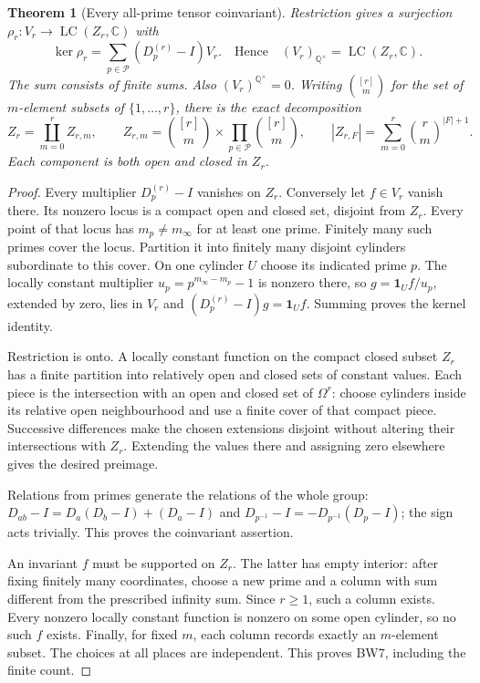 \documentclass[11pt]{article}
\newtheorem{theorem}{Theorem}
\newcommand{\C}{\mathbb C}
\newcommand{\Q}{\mathbb Q}
\newcommand{\LC}{\operatorname{LC}}
\begin{document}
\begin{theorem}[Every all-prime tensor coinvariant]
Restriction gives a surjection $\rho_r:V_r\to\LC(Z_r,\C)$ with
\[
 \ker\rho_r=\sum_{p\in\mathcal P}(D_p^{(r)}-I)V_r.
 \quad\text{Hence}\quad
 (V_r)_{\Q^\times}=\LC(Z_r,\C).
 \tag{BW6}
\]
The sum consists of finite sums. Also $(V_r)^{\Q^\times}=0$.
Writing $\binom{[r]}m$ for the set of $m$-element subsets of
$\{1,\ldots,r\}$, there is the exact decomposition
\[
 Z_r=\coprod_{m=0}^r Z_{r,m},\qquad
 Z_{r,m}=\binom{[r]}m\times\prod_{p\in\mathcal P}\binom{[r]}m,
 \qquad
 |Z_{r,F}|=\sum_{m=0}^r\binom rm^{|F|+1}.
 \tag{BW7}
\]
Each component is both open and closed in $Z_r$.
\end{theorem}
\begin{proof}
Every multiplier $D_p^{(r)}-I$ vanishes on $Z_r$. Conversely let
$f\in V_r$ vanish there. Its nonzero locus is a compact open and closed
set, disjoint from $Z_r$. Every point of that locus has
$m_p\ne m_\infty$ for at least one prime. Finitely many such primes
cover the locus. Partition it into finitely many disjoint cylinders
subordinate to this cover. On one cylinder $U$ choose its indicated
prime $p$. The locally constant multiplier
$u_p=p^{m_\infty-m_p}-1$ is nonzero there, so
$g=\mathbf1_Uf/u_p$, extended by zero, lies in $V_r$ and
$(D_p^{(r)}-I)g=\mathbf1_Uf$. Summing proves the kernel identity.

Restriction is onto. A locally constant function on the compact closed
subset $Z_r$ has a finite partition into relatively open and closed
sets of constant values. Each piece is the intersection with an open
and closed set of $\Omega^r$: choose cylinders inside its relative
open neighbourhood and use a finite cover of that compact piece.
Successive differences make the chosen extensions disjoint without
altering their intersections with $Z_r$. Extending the values there
and assigning zero elsewhere gives the desired preimage.

Relations from primes generate the relations of the whole group:
$D_{ab}-I=D_a(D_b-I)+(D_a-I)$ and
$D_{p^{-1}}-I=-D_{p^{-1}}(D_p-I)$; the sign acts trivially.
This proves the coinvariant assertion.

An invariant $f$ must be supported on $Z_r$. The latter has empty
interior: after fixing finitely many coordinates, choose a new prime
and a column with sum different from the prescribed infinity sum.
Since $r\ge1$, such a column exists. Every nonzero locally constant
function is nonzero on some open cylinder, so no such $f$ exists.
Finally, for fixed $m$, each column records exactly an $m$-element
subset. The choices at all places are independent. This proves BW7,
including the finite count.
\end{proof}
\end{document}
